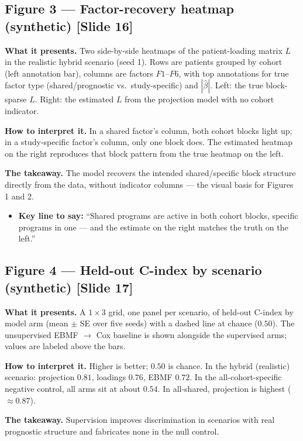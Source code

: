 \documentclass[11pt]{article}
\newcommand{\sectionlabel}[1]{\textbf{#1}}
\begin{document}
\subsection*{Figure 3 --- Factor-recovery heatmap (synthetic) [Slide 16]}
\sectionlabel{What it presents.} Two side-by-side heatmaps of the patient-loading matrix $L$ in the
realistic hybrid scenario (seed 1). Rows are patients grouped by cohort (left annotation bar),
columns are factors $F1$--$F6$, with top annotations for true factor type (shared/prognostic vs.\
study-specific) and $|\hat\beta|$. Left: the true block-sparse $L$. Right: the estimated $L$ from the
projection model with no cohort indicator.

\sectionlabel{How to interpret it.} In a shared factor's column, both cohort blocks light up; in a
study-specific factor's column, only one block does. The estimated heatmap on the right reproduces
that block pattern from the true heatmap on the left.

\sectionlabel{The takeaway.} The model recovers the intended shared/specific block structure directly
from the data, without indicator columns --- the visual basis for Figures 1 and 2.

\begin{itemize}
\item \sectionlabel{Key line to say:} ``Shared programs are active in both cohort blocks, specific
programs in one --- and the estimate on the right matches the truth on the left.''
\end{itemize}

\subsection*{Figure 4 --- Held-out C-index by scenario (synthetic) [Slide 17]}
\sectionlabel{What it presents.} A $1 \times 3$ grid, one panel per scenario, of held-out C-index by
model arm (mean $\pm$ SE over five seeds) with a dashed line at chance ($0.50$). The unsupervised
EBMF $\to$ Cox baseline is shown alongside the supervised arms; values are labeled above the bars.

\sectionlabel{How to interpret it.} Higher is better; $0.50$ is chance. In the hybrid (realistic)
scenario: projection $0.81$, loadings $0.76$, EBMF $0.72$. In the all-cohort-specific negative
control, all arms sit at about $0.54$. In all-shared, projection is highest ($\approx 0.87$).

\sectionlabel{The takeaway.} Supervision improves discrimination in scenarios with real prognostic
structure and fabricates none in the null control.
\end{document}
